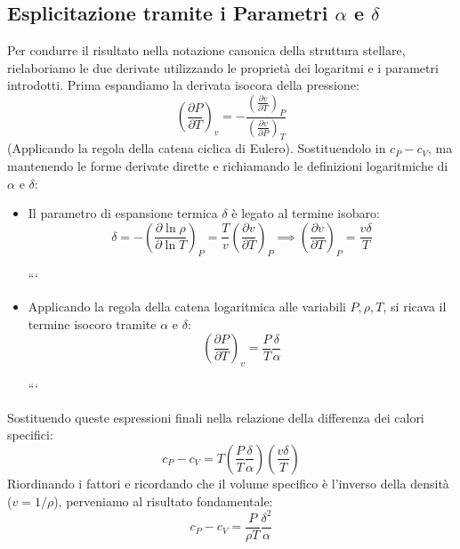 \subsection{Esplicitazione tramite i Parametri $\alpha$ e $\delta$}

Per condurre il risultato nella notazione canonica della struttura stellare, rielaboriamo le due derivate utilizzando le proprietà dei logaritmi e i parametri introdotti.
Prima espandiamo la derivata isocora della pressione:
\begin{equation}
\left(\frac{\partial P}{\partial T}\right)_v = - \frac{\left( \frac{\partial v}{\partial T} \right)_P}{\left( \frac{\partial v}{\partial P} \right)_T}
\end{equation}
(Applicando la regola della catena ciclica di Eulero). Sostituendolo in $c_P - c_V$, ma mantenendo le forme derivate dirette e richiamando le definizioni logaritmiche di $\alpha$ e $\delta$:

\begin{itemize}
\item Il parametro di espansione termica $\delta$ è legato al termine isobaro:
\begin{equation}
\delta = - \left( \frac{\partial \ln \rho}{\partial \ln T} \right)_P = \frac{T}{v} \left(\frac{\partial v}{\partial T}\right)_P \implies \left(\frac{\partial v}{\partial T}\right)_P = \frac{v \delta}{T}
\end{equation}

```
\item Applicando la regola della catena logaritmica alle variabili $P, \rho, T$, si ricava il termine isocoro tramite $\alpha$ e $\delta$:
\begin{equation}
    \left( \frac{\partial P}{\partial T} \right)_v = \frac{P}{T} \frac{\delta}{\alpha}
\end{equation}

```

\end{itemize}

Sostituendo queste espressioni finali nella relazione della differenza dei calori specifici:
\begin{equation}
c_P - c_V = T \left( \frac{P}{T} \frac{\delta}{\alpha} \right) \left( \frac{v \delta}{T} \right)
\end{equation}
Riordinando i fattori e ricordando che il volume specifico è l'inverso della densità ($v = 1/\rho$), perveniamo al risultato fondamentale:
\begin{equation}
c_P - c_V = \frac{P}{\rho T} \frac{\delta^2}{\alpha}
\end{equation}

